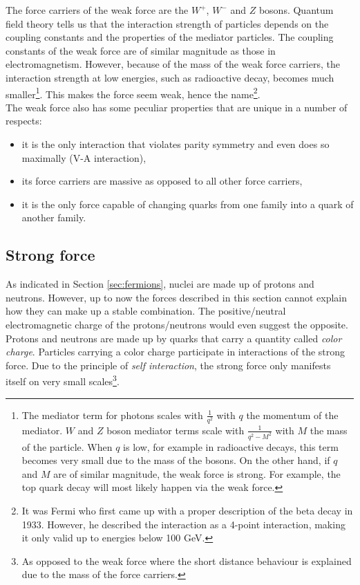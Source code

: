 The force carriers of the weak force are the $W^+$, $W^-$ and $Z$ bosons. 
Quantum field theory tells us that the interaction strength of particles depends on the coupling constants and the properties of the mediator particles. The coupling constants of the weak force are of similar magnitude as those in electromagnetism. However, because of the mass of the weak force carriers, the interaction strength at low energies, such as radioactive decay, becomes much smaller\footnote{The mediator term for photons scales with $\frac{1}{q^2}$ with  $q$ the momentum of the mediator. $W$ and $Z$ boson mediator terms scale with $\frac{1}{q^2 - M^2}$ with $M$ the mass of the particle. When $q$ is low, for example in radioactive decays, this term becomes very small due to the mass of the bosons. On the other hand, if $q$ and $M$ are of similar magnitude, the weak force is strong. For example, the top quark decay will most likely happen via the weak force.}. This makes the force seem weak, hence the name\footnote{It was Fermi who first came up with a proper description of the beta decay in 1933. However, he described the interaction as a 4-point interaction, making it only valid up to energies below 100 GeV.}.\\

\noindent The weak force also has some peculiar properties that are unique in a number of respects:

\vspace{2mm}
\begin{itemize}
\item it is the only interaction that violates parity symmetry and even does so maximally (V-A interaction),
\item its force carriers are massive as opposed to all other force carriers,
\item it is the only force capable of changing quarks from one family into a quark of another family.
\end{itemize}

\subsection{Strong force}
\label{subsec:strong}
As indicated in Section \ref{sec:fermions}, nuclei are made up of protons and neutrons. However, up to now the forces described in this section cannot explain how they can make up a stable combination. The positive/neutral electromagnetic charge of the protons/neutrons would even suggest the opposite. Protons and neutrons are made up by quarks that carry a quantity called \textit{color charge}. Particles carrying a color charge participate in interactions of the strong force. Due to the principle of \textit{self interaction}, the strong force only manifests itself on very small scales\footnote{As opposed to the weak force where the short distance behaviour is explained due to the mass of the force carriers.}.

